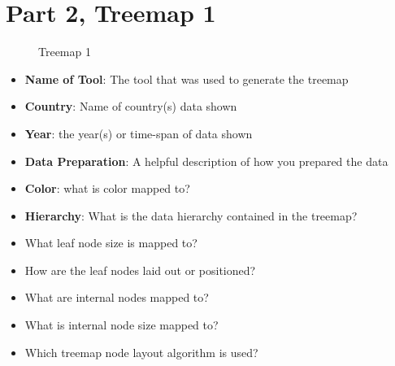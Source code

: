 \hypertarget{part-2-treemap-1}{%
\section{Part 2, Treemap 1}\label{part-2-treemap-1}}

\begin{figure}
\centering
\caption{Treemap 1}
\end{figure}

\begin{itemize}
\tightlist
\item
  \textbf{Name of Tool}: The tool that was used to generate the treemap
\item
  \textbf{Country}: Name of country(s) data shown
\item
  \textbf{Year}: the year(s) or time-span of data shown
\item
  \textbf{Data Preparation}: A helpful description of how you prepared
  the data
\item
  \textbf{Color}: what is color mapped to?
\item
  \textbf{Hierarchy}: What is the data hierarchy contained in the
  treemap?
\item
  What leaf node size is mapped to?
\item
  How are the leaf nodes laid out or positioned?
\item
  What are internal nodes mapped to?
\item
  What is internal node size mapped to?
\item
  Which treemap node layout algorithm is used?
\end{itemize}

